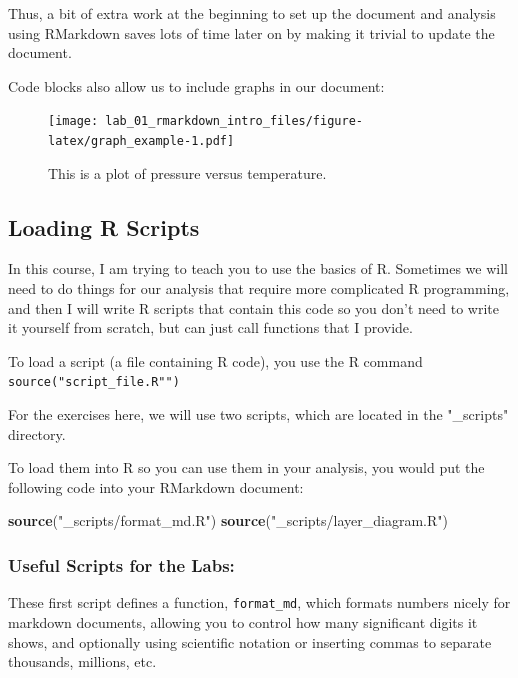 \documentclass[
]{article}
\newenvironment{Shaded}{\begin{snugshade}}{\end{snugshade}}
\newcommand{\KeywordTok}[1]{\textcolor[rgb]{0.13,0.29,0.53}{\textbf{#1}}}
\newcommand{\NormalTok}[1]{#1}
\newcommand{\StringTok}[1]{\textcolor[rgb]{0.31,0.60,0.02}{#1}}
\begin{document}
Thus, a bit of extra work at the beginning to set up the document and
analysis using RMarkdown saves lots of time later on by making it
trivial to update the document.

Code blocks also allow us to include graphs in our document:

\begin{figure}
\centering
\texttt{[image: lab\_01\_rmarkdown\_intro\_files/figure-latex/graph\_example-1.pdf]}
\caption{This is a plot of pressure versus temperature.}
\end{figure}

\hypertarget{loading-r-scripts}{%
\subsection{Loading R Scripts}\label{loading-r-scripts}}

In this course, I am trying to teach you to use the basics of R.
Sometimes we will need to do things for our analysis that require more
complicated R programming, and then I will write R scripts that contain
this code so you don't need to write it yourself from scratch, but can
just call functions that I provide.

To load a script (a file containing R code), you use the R command
\texttt{source("script\_file.R"")}

For the exercises here, we will use two scripts, which are located in
the "\_scripts" directory.

To load them into R so you can use them in your analysis, you would put
the following code into your RMarkdown document:

\begin{Shaded}
\begin{Highlighting}[]
\KeywordTok{source}\NormalTok{(}\StringTok{"_scripts/format_md.R"}\NormalTok{)}
\KeywordTok{source}\NormalTok{(}\StringTok{"_scripts/layer_diagram.R"}\NormalTok{)}
\end{Highlighting}
\end{Shaded}

\hypertarget{useful-scripts-for-the-labs}{%
\subsubsection{Useful Scripts for the
Labs:}\label{useful-scripts-for-the-labs}}

These first script defines a function, \texttt{format\_md}, which
formats numbers nicely for markdown documents, allowing you to control
how many significant digits it shows, and optionally using scientific
notation or inserting commas to separate thousands, millions, etc.
\end{document}
